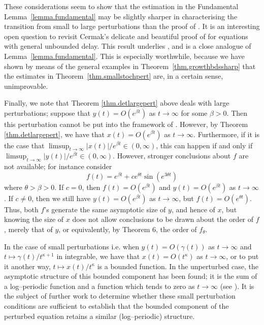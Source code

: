 \documentclass[a4paper,10pt,reqno]{amsart}
\numberwithin{equation}{section}
\theoremstyle{definition}
\theoremstyle{remark}
\DeclareMathOperator{\1}{\mathbbm 1}
\begin{document}
These considerations seem to show that the estimation in the Fundamental Lemma~\ref{lemma.fundamental} may be slightly sharper in characterising the transition from small to large perturbations than the proof of \cite[Theorem 2.3]{cermak}. It is an interesting open question to revisit Cermak's delicate and beautiful proof of \cite[Lemma 3.3]{cermak} for equations with general unbounded delay. This result underlies \cite[Theorem 2.3]{cermak}, and is a close analogue of Lemma~\ref{lemma.fundamental}. This is especially worthwhile, because we have shown by means of the general examples in Theorem~\ref{thm.growthbdssharp} that the estimates in Theorem~\ref{thm.smallstochpert} are, in a certain sense, unimprovable.

Finally, we note that Theorem \ref{thm.detlargepert} above deals with large perturbations; suppose that $y(t)=O(e^{\beta t})$ as $t\to\infty$ for some $\beta>0$. Then this perturbation cannot be put into the framework of \cite[Theorem 2.3]{cermak}. However, by Theorem \ref{thm.detlargepert}, we have that $x(t)=O(e^{\beta t})$ as $t\to\infty$. Furthermore, if it is the case that $\limsup_{t\to\infty} |x(t)|/e^{\beta t}\in (0,\infty)$, this can happen if and only if  $\limsup_{t\to\infty} |y(t)|/e^{\beta t}\in (0,\infty)$. However, stronger conclusions about $f$ are not available; for instance consider 
\[
f(t)=e^{\beta t} + ce^{\theta t}\sin(e^{3\theta t})
\]    
where $\theta>\beta>0$. If $c=0$, then $f(t)=O(e^{\beta t})$ and $y(t)=O(e^{\beta t})$ as $t\to\infty$. If $c\neq 0$, then we still have 
$y(t)=O(e^{\beta t})$ as $t\to\infty$, but $f(t)=O(e^{\theta t})$. Thus, both $f$'s generate the same asymptotic size of $y$, and hence of $x$, but knowing the size of $x$ does not allow conclusions to be drawn about the order of $f$, merely that of $y$, or equivalently, by Theorem 6, the order of $f_\theta$.  

In the case of small perturbations i.e. when $y(t)=O(\gamma(t))$ as $t\to\infty$ and $t\mapsto\gamma(t)/t^{\kappa+1}$ in integrable, we have that $x(t)=O(t^\kappa)$ as $t\to\infty$, or to put it another way, $t\mapsto x(t)/t^\kappa$ is a bounded function. In the unperturbed case, the asymptotic  structure of this bounded component has been found; it is the sum of a log--periodic function and a function which tends to zero as $t\to\infty$ (see \cite{KatoMc}). It is the subject of further work to determine whether these small perturbation conditions are sufficient to establish that the bounded component of the perturbed equation retains a similar (log--periodic) structure. 
\end{document}
